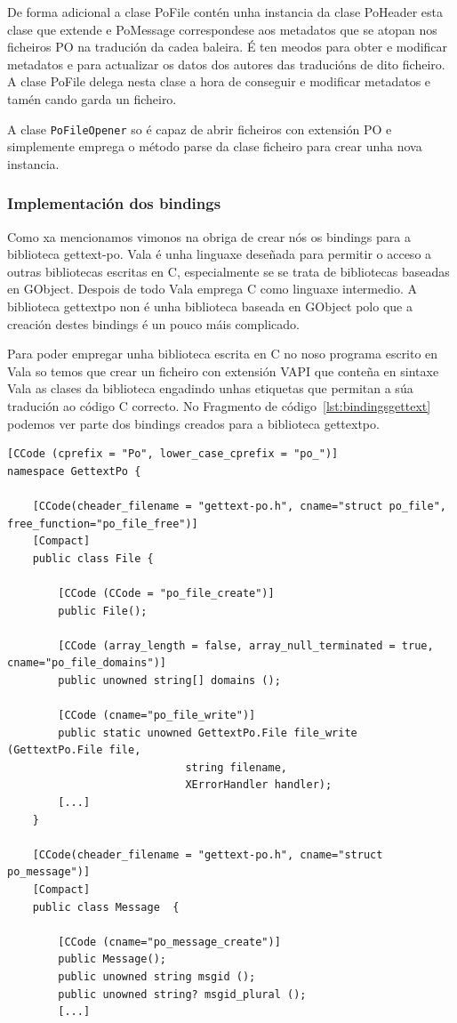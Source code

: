 De forma adicional a clase PoFile contén unha instancia da clase PoHeader esta clase que extende e PoMessage correspondese aos metadatos que se atopan nos ficheiros PO na tradución da cadea baleira. É ten meodos para obter e modificar metadatos e para actualizar os datos dos autores das traducións de dito ficheiro. A clase PoFile delega nesta clase a hora de conseguir e modificar metadatos e tamén cando garda un ficheiro.

A clase \lstinline{PoFileOpener} so é capaz de abrir ficheiros con extensión PO e simplemente emprega o método parse da clase ficheiro para crear unha nova instancia.

\subsubsection{Implementación dos bindings}
Como xa mencionamos vimonos na obriga de crear nós os bindings para a biblioteca gettext-po. Vala é unha linguaxe deseñada para permitir o acceso a outras bibliotecas escritas en C, especialmente se se trata de bibliotecas baseadas en GObject. Despois de todo Vala emprega C como linguaxe intermedio. A biblioteca gettextpo non é unha biblioteca baseada en GObject polo que a creación destes bindings é un pouco máis complicado.

Para poder empregar unha biblioteca escrita en C no noso programa escrito en Vala so temos que crear un ficheiro con extensión VAPI que conteña en sintaxe Vala as clases da biblioteca engadindo unhas etiquetas que permitan a súa tradución ao código C correcto. No Fragmento de código~\ref{lst:bindingsgettext} podemos ver parte dos bindings creados para a biblioteca gettextpo.

\lstset{language=[sharp]C}
\begin{lstlisting}[label=lst:bindingsgettext,caption=Bindings da biblioteca GettextPo]
[CCode (cprefix = "Po", lower_case_cprefix = "po_")]
namespace GettextPo {

    [CCode(cheader_filename = "gettext-po.h", cname="struct po_file", free_function="po_file_free")]
    [Compact]
    public class File {

        [CCode (CCode = "po_file_create")]
        public File();

        [CCode (array_length = false, array_null_terminated = true, cname="po_file_domains")]
        public unowned string[] domains ();

        [CCode (cname="po_file_write")]
        public static unowned GettextPo.File file_write (GettextPo.File file,
                            string filename,
                            XErrorHandler handler);
        [...]
    }

    [CCode(cheader_filename = "gettext-po.h", cname="struct po_message")]
    [Compact]
    public class Message  {

        [CCode (cname="po_message_create")]
        public Message();
        public unowned string msgid ();
        public unowned string? msgid_plural ();
        [...]
\end{lstlisting}

